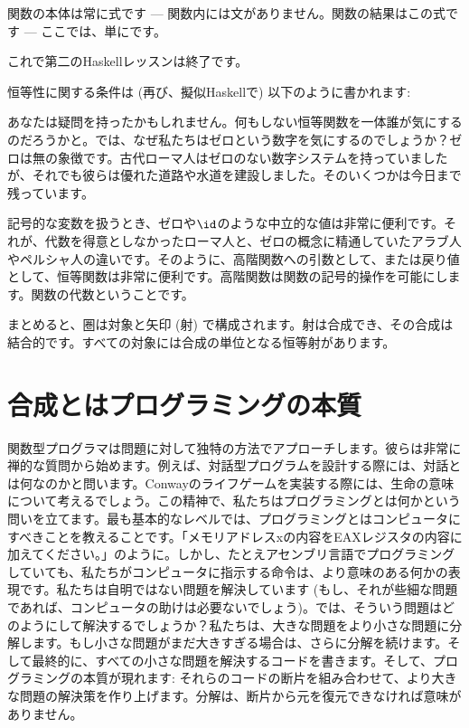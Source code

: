 関数の本体は常に式です --- 関数内には文がありません。関数の結果はこの式です --- ここでは、単にです。

これで第二のHaskellレッスンは終了です。

恒等性に関する条件は (再び、擬似Haskellで) 以下のように書かれます:

あなたは疑問を持ったかもしれません。何もしない恒等関数を一体誰が気にするのだろうかと。では、なぜ私たちはゼロという数字を気にするのでしょうか？ゼロは無の象徴です。古代ローマ人はゼロのない数字システムを持っていましたが、それでも彼らは優れた道路や水道を建設しました。そのいくつかは今日まで残っています。

記号的な変数を扱うとき、ゼロや$\id$のような中立的な値は非常に便利です。それが、代数を得意としなかったローマ人と、ゼロの概念に精通していたアラブ人やペルシャ人の違いです。そのように、高階関数への引数として、または戻り値として、恒等関数は非常に便利です。高階関数は関数の記号的操作を可能にします。関数の代数ということです。

まとめると、圏は対象と矢印 (射) で構成されます。射は合成でき、その合成は結合的です。すべての対象には合成の単位となる恒等射があります。

\section{合成とはプログラミングの本質}

関数型プログラマは問題に対して独特の方法でアプローチします。彼らは非常に禅的な質問から始めます。例えば、対話型プログラムを設計する際には、対話とは何なのかと問います。Conwayのライフゲームを実装する際には、生命の意味について考えるでしょう。この精神で、私たちはプログラミングとは何かという問いを立てます。最も基本的なレベルでは、プログラミングとはコンピュータにすべきことを教えることです。「メモリアドレスxの内容をEAXレジスタの内容に加えてください。」のように。しかし、たとえアセンブリ言語でプログラミングしていても、私たちがコンピュータに指示する命令は、より意味のある何かの表現です。私たちは自明ではない問題を解決しています (もし、それが些細な問題であれば、コンピュータの助けは必要ないでしょう)。では、そういう問題はどのようにして解決するでしょうか？私たちは、大きな問題をより小さな問題に分解します。もし小さな問題がまだ大きすぎる場合は、さらに分解を続けます。そして最終的に、すべての小さな問題を解決するコードを書きます。そして、プログラミングの本質が現れます: それらのコードの断片を組み合わせて、より大きな問題の解決策を作り上げます。分解は、断片から元を復元できなければ意味がありません。

